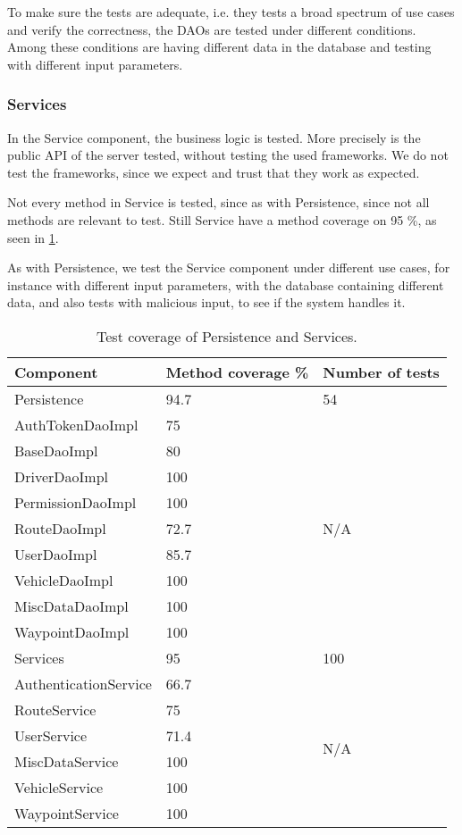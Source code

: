 To make sure the tests are adequate, i.e. they tests a broad spectrum of use cases and verify the correctness,
the \acp{DAO} are tested under different conditions.
Among these conditions are having different data in the database and testing with different input parameters.

\subsubsection{Services}
In the Service component, the business logic is tested.
More precisely is the public \ac{API} of the server tested, without testing the used frameworks.
We do not test the frameworks, since we expect and trust that they work as expected.

Not every method in Service is tested, since as with Persistence, since not all methods are relevant to test.
Still Service have a method coverage on 95 \%, as seen in \cref{tab:test_cov}.

As with Persistence, we test the Service component under different use cases, for instance with different input parameters,
with the database containing different data, and also tests with malicious input, to see if the system handles it.

\begin{table}
    \center
    \begin{tabular}{l|l|l}
        \textbf{Component}      & \textbf{Method coverage \%} & \textbf{Number of tests} \\
        \toprule
        Persistence             & 94.7  & 54 \\
        \toprule
        AuthTokenDaoImpl        & 75    & \multirow{9}{*}{N/A} \\
        BaseDaoImpl             & 80    & \\
        DriverDaoImpl           & 100   & \\
        PermissionDaoImpl       & 100   & \\
        RouteDaoImpl            & 72.7  & \\
        UserDaoImpl             & 85.7  & \\
        VehicleDaoImpl          & 100   & \\
        MiscDataDaoImpl      & 100   & \\
        WaypointDaoImpl         & 100   & \\
        \midrule
        Services                & 95    & 100 \\
        \toprule
        AuthenticationService   & 66.7  & \multirow{6}{*}{N/A} \\
        RouteService            & 75    & \\
        UserService             & 71.4  & \\
        MiscDataService      & 100   & \\
        VehicleService          & 100   & \\
        WaypointService         & 100   & \\
        \bottomrule
    \end{tabular}
    \caption{Test coverage of Persistence and Services.}\label{tab:test_cov}
\end{table}
